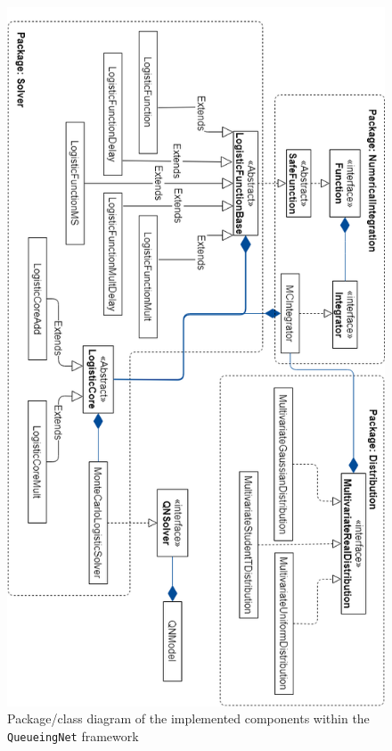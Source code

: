 \newpage
    \begin{figure}[H]
    \begin{center}
    \includegraphics[width=.75\textwidth]{Chap5_DesignAndImplementation/DistributionsPackage.png}
    \caption{Package/class diagram of the implemented components within the \texttt{QueueingNet} framework}
    \label{fig:DistributionsPackage}
    \end{center}
    \end{figure}
\newpage

